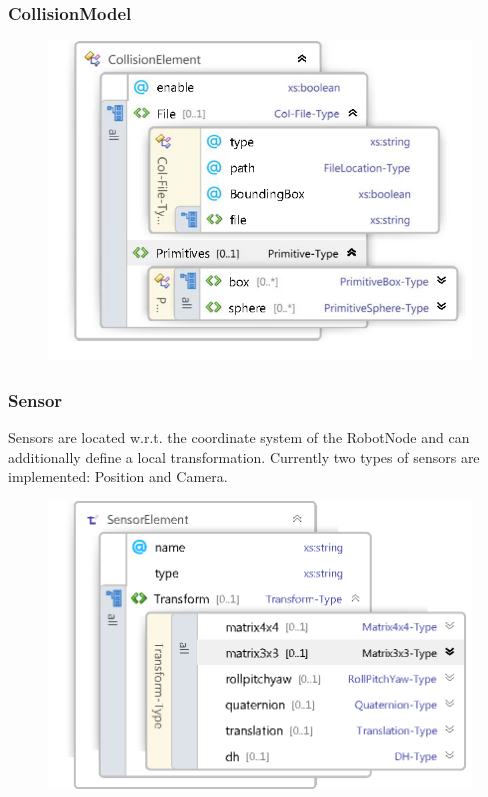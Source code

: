 \documentclass{book}
\begin{document}
\subsubsection{CollisionModel}
\begin{figure}[H]
	\centering
	\includegraphics[scale = 0.3]{Xsd_CollisionModel}
\end{figure}

\subsubsection{Sensor}
Sensors are located w.r.t. the coordinate system of the RobotNode and can additionally define a local transformation. Currently two types of sensors are implemented: Position and Camera. 
\begin{figure}[H]
	\centering
	\includegraphics[scale = 0.3]{Xsd_Sensor}
\end{figure}
\end{document}
